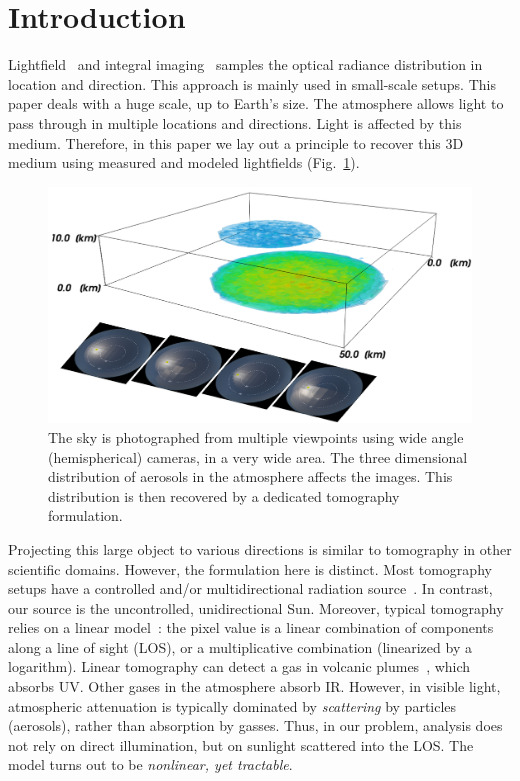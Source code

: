 \documentclass[10pt,twocolumn,letterpaper]{article}
\newcommand{\yoavcomment}[1]{}
\renewcommand{\yoavcomment}[1]{#1} %
\begin{document}
\section{Introduction}

Lightfield~\cite{Perwass} and integral imaging~\cite{bishop,horstmeyer,kim,levoy}  samples the optical radiance distribution in location and direction. This approach is mainly used in small-scale setups. This paper deals with a huge scale, up to Earth's size.
The atmosphere allows light to pass through in multiple locations and directions. Light is affected by this medium. Therefore, in this paper we lay out a principle to recover this 3D medium using measured and modeled lightfields (Fig.~\ref{fig:front}).
\begin{figure}[t!]
  \centering
  \yoavcomment{\includegraphics[width=\columnwidth]{images/front_img.pdf}}
    \caption{\small The sky is photographed from multiple viewpoints using wide angle (hemispherical) cameras, in a very wide area. The three dimensional distribution of aerosols in the atmosphere affects the images. This distribution is then recovered by a dedicated tomography formulation.}
  \label{fig:front}
\end{figure}

Projecting this large object to various directions is similar to tomography in other scientific domains. However, the formulation here is distinct. Most tomography setups have a controlled and/or multidirectional radiation source~\cite{gorbunov,messer}. In contrast, our source is the uncontrolled, unidirectional Sun. Moreover, typical tomography relies on a linear model~\cite{gregson}: the pixel value is a linear combination of components along a line of sight (LOS), or a multiplicative combination (linearized by a logarithm). Linear tomography can detect a gas in volcanic plumes~\cite{wright}, which absorbs UV. Other gases in the atmosphere absorb IR. However, in visible light, atmospheric attenuation is typically dominated by {\em scattering} by particles (aerosols), rather than absorption by gasses. Thus, %
in our problem, analysis does not rely on direct illumination, but on sunlight scattered into the LOS. The model turns out to be {\em nonlinear, yet tractable}.
\end{document}
